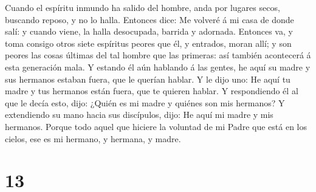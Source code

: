 Cuando el espíritu inmundo ha salido del hombre, anda
por lugares secos, buscando reposo, y no lo halla. 
Entonces dice: Me volveré á mi casa de donde salí: y cuando viene, la
halla desocupada, barrida y adornada.  Entonces va, y
toma consigo otros siete espíritus peores que él, y entrados, moran
allí; y son peores las cosas últimas del tal hombre que las primeras:
así también acontecerá á esta generación mala.  Y estando
él aún hablando á las gentes, he aquí su madre y sus hermanos estaban
fuera, que le querían hablar.  Y le dijo uno: He aquí tu
madre y tus hermanos están fuera, que te quieren hablar. 
Y respondiendo él al que le decía esto, dijo: ¿Quién es mi madre y
quiénes son mis hermanos?  Y extendiendo su mano hacia
sus discípulos, dijo: He aquí mi madre y mis hermanos. 
Porque todo aquel que hiciere la voluntad de mi Padre que está en los
cielos, ese es mi hermano, y hermana, y madre.

\hypertarget{section-12}{%
\section{13}\label{section-12}}

